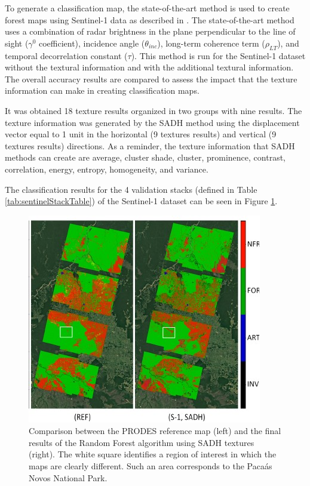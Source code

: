 To generate a classification map, the state-of-the-art method is used to create forest maps using Sentinel-1 data as described in \cite{Paolo}. The state-of-the-art method uses a combination of radar brightness in the plane perpendicular to the line of sight ($\gamma^0$ coefficient), incidence angle ($\theta_{inc}$), long-term coherence term ($\rho_{LT}$), and temporal decorrelation constant ($\tau$). This method is run for the Sentinel-1 dataset without the textural information and with the additional textural information. The overall accuracy results are compared to assess the impact that the texture information can make in creating classification maps.

It was obtained 18 texture results organized in two groups with nine results. The texture information was generated by the SADH method using the displacement vector equal to 1 unit in the horizontal (9 textures results) and vertical (9 textures results) directions. As a reminder, the texture information that SADH methods can create are average, cluster shade, cluster, prominence, contrast, correlation, energy, entropy, homogeneity, and variance.

The classification results for the 4 validation stacks (defined in Table \ref{tab:sentinelStackTable}) of the Sentinel-1 dataset can be seen in Figure \ref{img:sentinel_results}.

\begin{figure}
    \centering
    \includegraphics[width=0.9\linewidth]{Cap3-Results/sentinel1-classificationresults.jpg}
    \caption{Comparison between the PRODES reference map (left) and the final results of the Random Forest algorithm using SADH textures (right). The white square identifies a region of interest in which the maps are clearly different.
    Such an area corresponds to the Pacaás Novos National Park.}
    \label{img:sentinel_results}
\end{figure}

